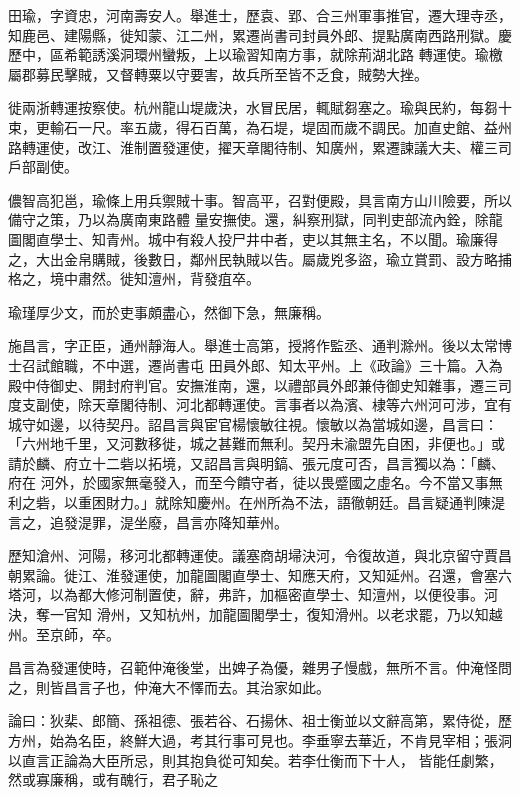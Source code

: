 \begin{pinyinscope}
 田瑜，字資忠，河南壽安人。舉進士，歷袁、郢、合三州軍事推官，遷大理寺丞，知鹿邑、建陽縣，徙知蒙、江二州，累遷尚書司封員外郎、提點廣南西路刑獄。慶歷中，區希範誘溪洞環州蠻叛，上以瑜習知南方事，就除荊湖北路
 轉運使。瑜檄屬郡募民擊賊，又督轉粟以守要害，故兵所至皆不乏食，賊勢大挫。



 徙兩浙轉運按察使。杭州龍山堤歲決，水冒民居，輒賦芻塞之。瑜與民約，每芻十束，更輸石一尺。率五歲，得石百萬，為石堤，堤固而歲不調民。加直史館、益州路轉運使，改江、淮制置發運使，擢天章閣待制、知廣州，累遷諫議大夫、權三司戶部副使。



 儂智高犯邕，瑜條上用兵禦賊十事。智高平，召對便殿，具言南方山川險要，所以備守之策，乃以為廣南東路體
 量安撫使。還，糾察刑獄，同判吏部流內銓，除龍圖閣直學士、知青州。城中有殺人投尸井中者，吏以其無主名，不以聞。瑜廉得之，大出金帛購賊，後數日，鄰州民執賊以告。屬歲兇多盜，瑜立賞罰、設方略捕格之，境中肅然。徙知澶州，背發疽卒。



 瑜瑾厚少文，而於吏事頗盡心，然御下急，無廉稱。



 施昌言，字正臣，通州靜海人。舉進士高第，授將作監丞、通判滁州。後以太常博士召試館職，不中選，遷尚書屯
 田員外郎、知太平州。上《政論》三十篇。入為殿中侍御史、開封府判官。安撫淮南，還，以禮部員外郎兼侍御史知雜事，遷三司度支副使，除天章閣待制、河北都轉運使。言事者以為濱、棣等六州河可涉，宜有城守如邊，以待契丹。詔昌言與宦官楊懷敏往視。懷敏以為當城如邊，昌言曰：「六州地千里，又河數移徙，城之甚難而無利。契丹未渝盟先自困，非便也。」或請於麟、府立十二砦以拓境，又詔昌言與明鎬、張元度可否，昌言獨以為：「麟、府在
 河外，於國家無毫發入，而至今饋守者，徒以畏蹙國之虛名。今不當又事無利之砦，以重困財力。」就除知慶州。在州所為不法，語徹朝廷。昌言疑通判陳湜言之，追發湜罪，湜坐廢，昌言亦降知華州。



 歷知滄州、河陽，移河北都轉運使。議塞商胡埽決河，令復故道，與北京留守賈昌朝累論。徙江、淮發運使，加龍圖閣直學士、知應天府，又知延州。召還，會塞六塔河，以為都大修河制置使，辭，弗許，加樞密直學士、知澶州，以便役事。河決，奪一官知
 滑州，又知杭州，加龍圖閣學士，復知滑州。以老求罷，乃以知越州。至京師，卒。



 昌言為發運使時，召範仲淹後堂，出婢子為優，雜男子慢戲，無所不言。仲淹怪問之，則皆昌言子也，仲淹大不懌而去。其治家如此。



 論曰：狄棐、郎簡、孫祖德、張若谷、石揚休、祖士衡並以文辭高第，累侍從，歷方州，始為名臣，終鮮大過，考其行事可見也。李垂寧去華近，不肯見宰相；張洞以直言正論為大臣所忌，則其抱負從可知矣。若李仕衡而下十人，
 皆能任劇繁，然或寡廉稱，或有醜行，君子恥之



\end{pinyinscope}